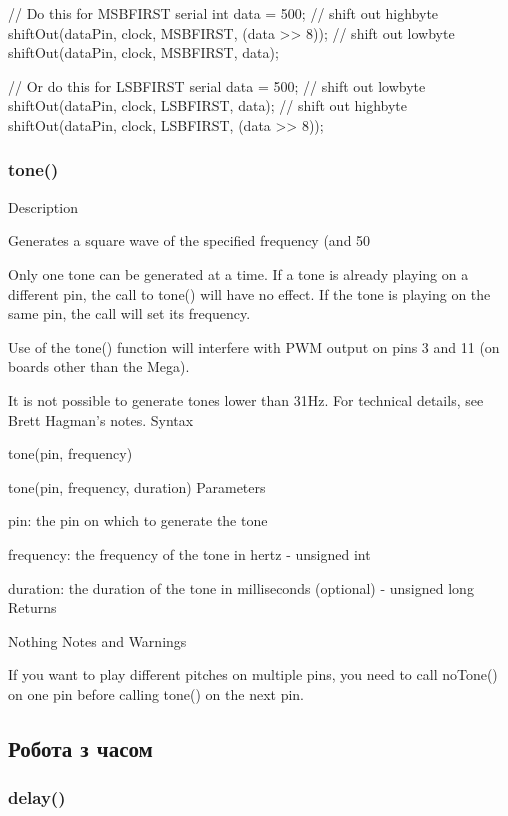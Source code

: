 \documentclass[12pt,a4paper]{report}  %
\begin{document}
// Do this for MSBFIRST serial
int data = 500;
// shift out highbyte
shiftOut(dataPin, clock, MSBFIRST, (data >> 8));
// shift out lowbyte
shiftOut(dataPin, clock, MSBFIRST, data);

// Or do this for LSBFIRST serial
data = 500;
// shift out lowbyte
shiftOut(dataPin, clock, LSBFIRST, data);
// shift out highbyte
shiftOut(dataPin, clock, LSBFIRST, (data >> 8));

\subsubsection{tone()}\label{tone}


Description

Generates a square wave of the specified frequency (and 50%

Only one tone can be generated at a time. If a tone is already playing on a different pin, the call to tone() will have no effect. If the tone is playing on the same pin, the call will set its frequency.

Use of the tone() function will interfere with PWM output on pins 3 and 11 (on boards other than the Mega).

It is not possible to generate tones lower than 31Hz. For technical details, see Brett Hagman’s notes.
Syntax

tone(pin, frequency)

tone(pin, frequency, duration)
Parameters

pin: the pin on which to generate the tone

frequency: the frequency of the tone in hertz - unsigned int

duration: the duration of the tone in milliseconds (optional) - unsigned long
Returns

Nothing
Notes and Warnings

If you want to play different pitches on multiple pins, you need to call noTone() on one pin before calling tone() on the next pin.


\subsection{Робота з часом}

\subsubsection{delay()}\label{delay()}
\end{document}
